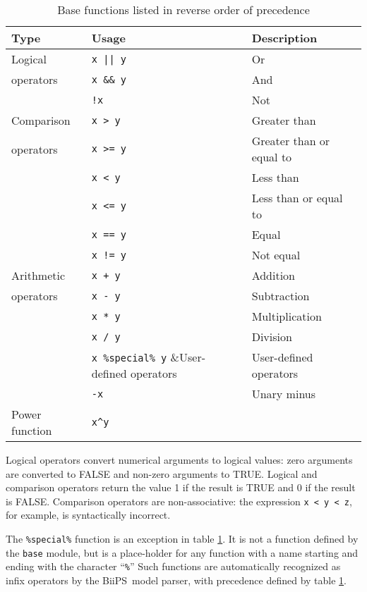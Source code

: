 \documentclass[11pt, a4paper, titlepage]{report}
\newcommand{\biips}{\textsf{BiiPS}}
\begin{document}
\begin{table}[h!]
\begin{center}
\begin{tabular}{lll}
\hline
Type & Usage & Description\\ 
\hline
Logical           & \verb+x || y+ & Or \\
operators         & \verb+x && y+ & And \\
                  & \verb+!x+     & Not \\
\hline
Comparison  & \verb+x > y+ & Greater than\\
operators   & \verb+x >= y+ & Greater than or equal to  \\
            & \verb+x < y+ & Less than \\
            & \verb+x <= y+ & Less than or equal to \\
            & \verb+x == y+ & Equal \\
            & \verb+x != y+ & Not equal \\
\hline
Arithmetic  & \verb-x + y- & Addition \\
operators   & \verb+x - y+ & Subtraction\\
            & \verb+x * y+ & Multiplication \\
            & \verb+x / y+ & Division \\
            & \verb+x %special% y+ &User-defined operators\\
            & \verb+-x+ & Unary minus\\
\hline
Power function & \verb+x^y+ & \\
\hline
\end{tabular}
\caption{Base functions listed in reverse order of precedence 
  \label{table:base:functions}}
\end{center}
\end{table}

Logical operators convert numerical arguments to logical values: zero
arguments are converted to FALSE and non-zero arguments to
TRUE. Logical and comparison operators return the value 1 if the
result is TRUE and 0 if the result is FALSE.  Comparison operators are
non-associative: the expression \verb+x < y < z+, for example, is
syntactically incorrect.

The \verb+%special%+ function is an exception in table
\ref{table:base:functions}. It is not a function defined by the
\verb+base+ module, but is a place-holder for any function
with a name starting and ending with the character ``\verb+%+'' Such
functions are automatically recognized as infix operators by the
\biips\ model parser, with precedence defined by table
\ref{table:base:functions}.
\end{document}
